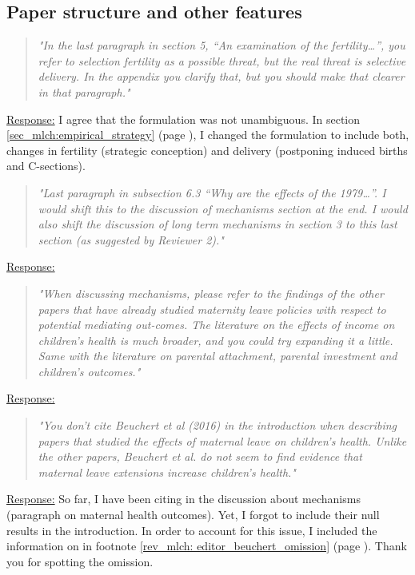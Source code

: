 \subsection*{Paper structure and other features}


\bigskip
\begin{quote}
	\textit{"In the last paragraph in section 5, “An examination of the fertility…”, you refer to selection fertility as a possible threat, but the real threat is selective delivery. In the appendix you clarify that, but you should make that clearer in that paragraph."}
\end{quote}
\underline{Response:}
I agree that the formulation was not unambiguous. In section \ref{sec_mlch:empirical_strategy} (page \pageref{rev_mlch: editor_selective_delivery}), I changed the formulation to include both, changes in fertility (strategic conception) and delivery (postponing induced births and C-sections). 




% 
\bigskip
\begin{quote}
	\textit{"Last paragraph in subsection 6.3 “Why are the effects of the 1979…”. I would shift this to the discussion of mechanisms section at the end. I would also shift the discussion of long term mechanisms in section 3 to this last section (as suggested by Reviewer 2)."}
\end{quote}
\underline{Response:}



% 
\bigskip
\begin{quote}
	\textit{"When discussing mechanisms, please refer to the findings of the other papers that have already studied maternity leave policies with respect to potential mediating out-comes. The literature on the effects of income on children’s health is much broader, and you could try expanding it a little. Same with the literature on parental attachment, parental investment and children’s outcomes."}
\end{quote}
\underline{Response:}



% 
\bigskip
\begin{quote}
	\textit{"You don’t cite Beuchert et al (2016) in the introduction when describing papers that studied the effects of maternal leave on children’s health. Unlike the other papers, Beuchert et al. do not seem to find evidence that maternal leave extensions increase children’s health."}
\end{quote}
\underline{Response:} So far, I have been citing \cite{beuchert2016} in the discussion about mechanisms (paragraph on maternal health outcomes). Yet, I forgot to include their null results in the introduction. In order to account for this issue, I included the information on \cite{beuchert2016} in footnote \ref{rev_mlch: editor_beuchert_omission} (page \pageref{rev_mlch: editor_beuchert_omission}). Thank you for spotting the omission.
